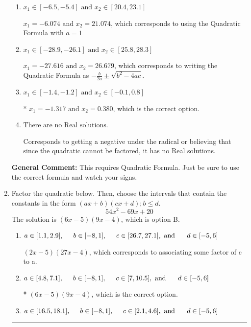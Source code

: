 \documentclass{extbook}[14pt]
\newcommand{\litem}[1]{\item #1

\rule{\textwidth}{0.4pt}}
\begin{document}
\begin{enumerate}
{\begin{enumerate}[label=\Alph*.]
 $x_1 = -0.380 \text{ and } x_2 = 1.317$, which corresponds to writing the Quadratic Formula as $\frac{b \pm \sqrt{b^2 - 4ac}}{2a}$
\item \( x_1 \in [-6.5, -5.4] \text{ and } x_2 \in [20.4, 23.1] \)

 $x_1 = -6.074 \text{ and } x_2 = 21.074$, which corresponds to using the Quadratic Formula with $a=1$
\item \( x_1 \in [-28.9, -26.1] \text{ and } x_2 \in [25.8, 28.3] \)

 $x_1 = -27.616 \text{ and } x_2 = 26.679$, which corresponds to writing the Quadratic Formula as $-\frac{b}{2a} \pm \sqrt{b^2 - 4ac}$.
\item \( x_1 \in [-1.4, -1.2] \text{ and } x_2 \in [-0.1, 0.8] \)

* $x_1 = -1.317 \text{ and } x_2 = 0.380$, which is the correct option.
\item \( \text{There are no Real solutions.} \)

Corresponds to getting a negative under the radical or believing that since the quadratic cannot be factored, it has no Real solutions.
\end{enumerate}

\textbf{General Comment:} This requires Quadratic Formula. Just be sure to use the correct formula and watch your signs.
}
\litem{
Factor the quadratic below. Then, choose the intervals that contain the constants in the form $(ax+b)(cx+d); b \leq d.$
\[ 54x^{2} -69 x + 20 \]The solution is \( (6x -5)(9x -4) \), which is option B.\begin{enumerate}[label=\Alph*.]
\item \( a \in [1.1, 2.9], \hspace*{5mm} b \in [-8, 1], \hspace*{5mm} c \in [26.7, 27.1], \text{ and } \hspace*{5mm} d \in [-5, 6] \)

 $(2x -5)(27x -4)$, which corresponds to associating some factor of c to a.
\item \( a \in [4.8, 7.1], \hspace*{5mm} b \in [-8, 1], \hspace*{5mm} c \in [7, 10.5], \text{ and } \hspace*{5mm} d \in [-5, 6] \)

* $(6x -5)(9x -4)$, which is the correct option.
\item \( a \in [16.5, 18.1], \hspace*{5mm} b \in [-8, 1], \hspace*{5mm} c \in [2.1, 4.6], \text{ and } \hspace*{5mm} d \in [-5, 6] \)


\end{enumerate}}
\end{enumerate}
\end{document}
